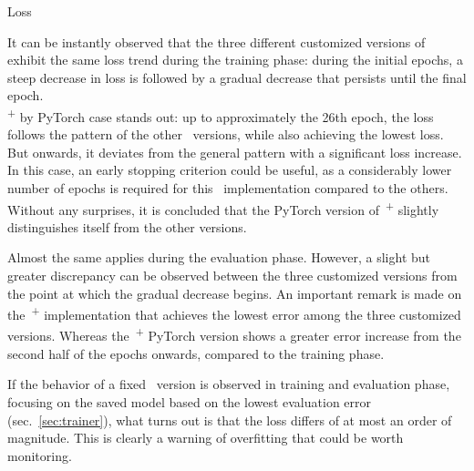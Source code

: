 \begin{subsection}{Loss}
    \begin{figure}[h!]
        \centering
        \begin{subfigure}[b]{0.48\textwidth}
            \centering
            
            \label{fig:training_loss}
        \end{subfigure}
        \hfill
        \begin{subfigure}[b]{0.48\textwidth}
            \centering
            
            \label{fig:evaluation_loss}
        \end{subfigure}
    \end{figure}
    \par It can be instantly observed that the three different customized versions of~ exhibit the same loss trend during the training phase: during the initial epochs, a steep decrease in loss is followed by a gradual decrease that persists until the final epoch.\\
    \textsuperscript{+} by PyTorch case stands out: up to approximately the 26th epoch, the loss follows the pattern of the other~ versions, while also achieving the lowest loss. But onwards, it deviates from the general pattern with a significant loss increase. In this case, an early stopping criterion could be useful, as a considerably lower number of epochs is required for this~ implementation compared to the others.
    Without any surprises, it is concluded that the PyTorch version of~\textsuperscript{+} slightly distinguishes itself from the other versions.\\
    \par Almost the same applies during the evaluation phase. However, a slight but greater discrepancy can be observed between the three customized versions from the point at which the gradual decrease begins. An important remark is made on the~\textsuperscript{+} implementation that achieves the lowest error among the three customized versions. Whereas the~\textsuperscript{+} PyTorch version shows a greater error increase from the second half of the epochs onwards, compared to the training phase.\\
    \par If the behavior of a fixed~ version is observed in training and evaluation phase, focusing on the saved model based on the lowest evaluation error (sec.~\ref{sec:trainer}), what turns out is that the loss differs of at most an order of magnitude. This is clearly a warning of overfitting that could be worth monitoring.
\end{subsection}
\clearpage